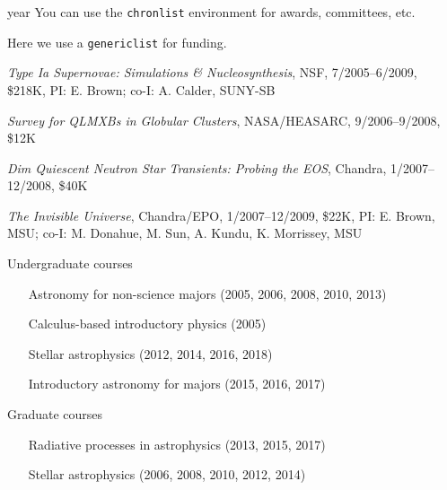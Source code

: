 \documentclass[11pt]{vitae}
\begin{document}
\begin{chronlist}
\item[year] You can use the \verb+chronlist+ environment for awards, committees, etc.
\end{chronlist}


Here we use a \verb+genericlist+ for funding.

\begin{genericlist}
\item \emph{Type Ia Supernovae: Simulations \& Nucleosynthesis}, NSF, 7/2005--6/2009, \$218K, PI: E. Brown;  co-I: A. Calder, SUNY-SB
\item \emph{Survey for QLMXBs in Globular Clusters}, NASA/HEASARC, 9/2006--9/2008, \$12K
\item \emph{Dim Quiescent Neutron Star Transients: Probing the EOS}, Chandra, 1/2007--12/2008, \$40K
\item \emph{The Invisible Universe}, Chandra/EPO, 1/2007--12/2009, \$22K, PI: E. Brown, MSU; co-I: M. Donahue, M. Sun, A. Kundu, K. Morrissey, MSU
\end{genericlist}


\begin{genericlist}
\item Undergraduate courses
	\begin{itemize}
		\item[] Astronomy for non-science majors (2005, 2006,  2008, 2010, 2013)
		\item[] Calculus-based introductory physics (2005)
		\item[] Stellar astrophysics (2012, 2014, 2016, 2018)
		\item[] Introductory astronomy for majors (2015, 2016, 2017)
	\end{itemize}
\item Graduate courses
	\begin{itemize}
		\item[] Radiative processes in astrophysics (2013, 2015, 2017)
		\item[] Stellar astrophysics (2006, 2008, 2010, 2012, 2014)
	\end{itemize}
\end{genericlist}
\end{document}
